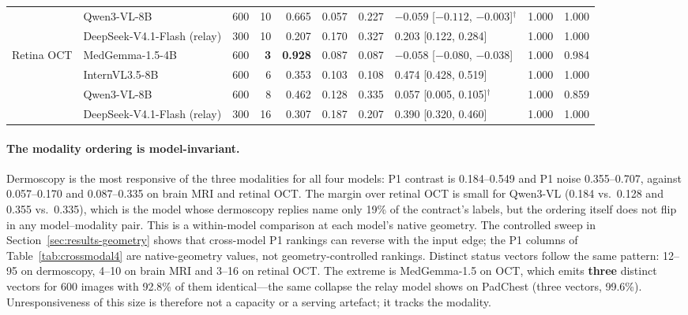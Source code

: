 \begin{table}[t]
\begin{tabular}{l l r r r r r l r r}
           & Qwen3-VL-8B & 600 & 10 & 0.665 & 0.057 & 0.227 & $-0.059$ [$-0.112$, $-0.003$]$^{\dagger}$ & 1.000 & 1.000 \\
           & DeepSeek-V4.1-Flash (relay) & 300 & 10 & 0.207 & 0.170 & 0.327 & 0.203 [0.122, 0.284] & 1.000 & 1.000 \\
\midrule
Retina OCT & MedGemma-1.5-4B & 600 & \textbf{3} & \textbf{0.928} & 0.087 & 0.087 & $-0.058$ [$-0.080$, $-0.038$] & 1.000 & 0.984 \\
           & InternVL3.5-8B & 600 & 6 & 0.353 & 0.103 & 0.108 & 0.474 [0.428, 0.519] & 1.000 & 1.000 \\
           & Qwen3-VL-8B & 600 & 8 & 0.462 & 0.128 & 0.335 & 0.057 [0.005, 0.105]$^{\dagger}$ & 1.000 & 0.859 \\
           & DeepSeek-V4.1-Flash (relay) & 300 & 16 & 0.307 & 0.187 & 0.207 & 0.390 [0.320, 0.460] & 1.000 & 1.000 \\
\bottomrule
\end{tabular}
\end{table}

\paragraph{The modality ordering is model-invariant.} Dermoscopy is the most responsive of
the three modalities for all four models: P1 contrast is 0.184--0.549 and P1 noise
0.355--0.707, against 0.057--0.170 and 0.087--0.335 on brain MRI and retinal OCT. The
margin over retinal OCT is small for Qwen3-VL (0.184 vs.\ 0.128 and 0.355 vs.\ 0.335),
which is the model whose dermoscopy replies name only 19\% of the contract's labels, but
the ordering itself does not flip in any model--modality pair. This is a within-model
comparison at each model's native geometry. The controlled sweep in
Section~\ref{sec:results-geometry} shows that cross-model P1 rankings can reverse with the
input edge; the P1 columns of Table~\ref{tab:crossmodal4} are native-geometry values, not
geometry-controlled rankings. Distinct status vectors
follow the same pattern: 12--95 on dermoscopy, 4--10 on brain MRI and 3--16 on retinal OCT.
The extreme is MedGemma-1.5 on OCT, which emits \textbf{three} distinct vectors for 600
images with 92.8\% of them identical---the same collapse the relay model shows on PadChest
(three vectors, 99.6\%). Unresponsiveness of this size is therefore not a capacity or a
serving artefact; it tracks the modality.

